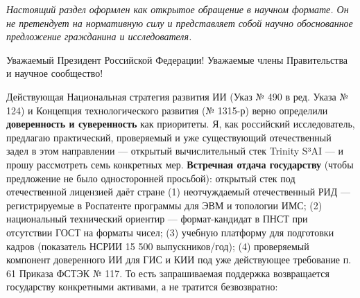 \documentclass[
  russian,
]{article}
\begin{document}
\emph{Настоящий раздел оформлен как открытое обращение в научном
формате. Он не претендует на нормативную силу и представляет собой
научно обоснованное предложение гражданина и исследователя.}

Уважаемый Президент Российской Федерации! Уважаемые члены Правительства
и научное сообщество!

Действующая Национальная стратегия развития ИИ (Указ № 490 в ред. Указа
№ 124) и Концепция технологического развития (№ 1315-р) верно определили
\textbf{доверенность и суверенность} как приоритеты. Я, как российский
исследователь, предлагаю практический, проверяемый и уже существующий
отечественный задел в этом направлении --- открытый вычислительный стек
Trinity S³AI --- и прошу рассмотреть семь конкретных мер.
\textbf{Встречная отдача государству} (чтобы предложение не было
односторонней просьбой): открытый стек под отечественной лицензией даёт
стране (1) неотчуждаемый отечественный РИД --- регистрируемые в
Роспатенте программы для ЭВМ и топологии ИМС; (2) национальный
технический ориентир --- формат-кандидат в ПНСТ при отсутствии ГОСТ на
форматы чисел; (3) учебную платформу для подготовки кадров (показатель
НСРИИ 15 500 выпускников/год); (4) проверяемый компонент доверенного ИИ
для ГИС и КИИ под уже действующее требование п. 61 Приказа ФСТЭК № 117.
То есть запрашиваемая поддержка возвращается государству конкретными
активами, а не тратится безвозвратно:
\end{document}
